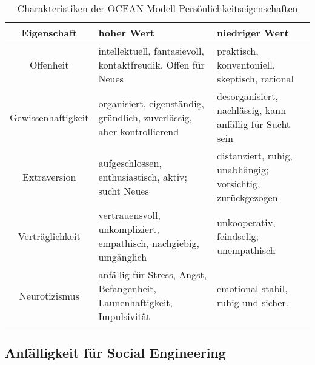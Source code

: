 \begin{table}[!h]
    \begin{center}
        \caption{Charakteristiken der OCEAN-Modell Persönlichkeitseigenschaften }
        \begin{tabular}{ |c|m{11em}|m{11em}| }
            \hline
            \textbf{Eigenschaft} & \textbf{hoher Wert}                                                      & \textbf{niedriger Wert}                                   \\
            \hline \hline
            Offenheit                           & intellektuell, fantasievoll, kontaktfreudik. Offen für Neues             & praktisch, konventoniell, skeptisch, rational             \\
            \hline
            Gewissenhaftigkeit                  & organisiert, eigenständig, gründlich, zuverlässig, aber kontrollierend   & desorganisiert, nachlässig, kann anfällig für Sucht sein  \\
            \hline
            Extraversion                        & aufgeschlossen, enthusiastisch, aktiv; sucht Neues                       & distanziert, ruhig, unabhängig; vorsichtig, zurückgezogen \\
            \hline
            Verträglichkeit                     & vertrauensvoll, unkompliziert, empathisch, nachgiebig, umgänglich        & unkooperativ, feindselig; unempathisch                    \\
            \hline
            Neurotizismus                       & anfällig für Stress, Angst, Befangenheit, Launenhaftigkeit, Impulsivität & emotional stabil, ruhig und sicher.                       \\
            \hline
        \end{tabular}
    \end{center}
\end{table}

\subsection{Anfälligkeit für Social Engineering}





